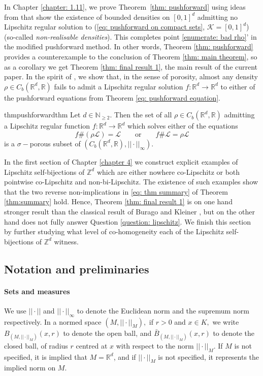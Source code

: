 \documentclass{article}
\newcommand{\R}{\mathbb{R}}
\newcommand{\Z}{\mathbb{Z}}
\newcommand{\N}{\mathbb{N}}
\newcommand{\leb}{\mc{L}}
\newcommand{\mc}[1]{\mathcal{#1}}
\begin{document}
In Chapter \ref{chapter: 1.11}, we prove Theorem~\ref{thm: pushforward} using ideas from \cite{dymond2018mapping} that show the existence of bounded densities on $[0,1]^d$ admitting no Lipschitz regular solution to (\ref{eq: pushforward on compact sets}, $\mathcal{K} = [0,1]^d$) (so-called \emph{non-realisable densities}). This completes point \ref{enumerate: bad rho}' in the modified pushforward method. In other words, Theorem \ref{thm: pushforward} provides a counterexample to the conclusion of Theorem \ref{thm: main theorem}, so as a corollary we get Theorem \ref{thm: final result 1}, the main result of the current paper. In the spirit of \cite[Theorem~$4.1$]{dymond2018mapping}, we show that, in the sense of porosity, almost any density $\rho \in C_b(\R^d,\R)$ fails to admit a Lipschitz regular solution $f:\R^d \to \R^d$ to either of the pushforward equations from Theorem \ref{eq: pushforward equation}.
\begin{restatable}{thm}{pushforwardthm} \label{thm: pushforward}
    Let $d \in \N_{\geq 2}.$ Then the set of all $\rho\in C_b(\R^d,\R)$ admitting a Lipschitz regular function $f: \R^d \to \R^d$ which solves either of the equations $$f\#(\rho\leb) = \leb \qquad \text{or} \qquad f\#\leb = \rho\leb$$ is a $\sigma-$porous subset of $(C_b(\R^d,\R), ||\cdot||_{\infty}).$
\end{restatable}
In the first section of Chapter \ref{chapter 4} we construct explicit examples of Lipschitz self-bijections of $\Z^d$ which are either nowhere co-Lipschitz or both pointwise co-Lipschitz and non-bi-Lipschitz. The existence of such examples show that the two reverse non-implications in \eqref{eq: thm summary} of Theorem \ref{thm:summary} hold.
Hence, Theorem \ref{thm: final result 1} is on one hand stronger result than the classical result of Burago and Kleiner \cite[Theorem~$1.1$]{burago1998separated}, but on the other hand does not fully answer Question \ref{question: lipschitz}. 
We finish this section by further studying what level of co-homogeneity each of the Lipschitz self-bijections of $\Z^d$ witness.

\subsection{Notation and preliminaries}
\paragraph{Sets and measures}
We use $||\cdot||$ and $||\cdot||_\infty$ to denote the Euclidean norm and the supremum norm respectively. In a normed space $(M,||\cdot||_M),$ if $r>0$ and $x \in K,$ we write $B_{(M,||\cdot||_M)}(x,r)$ to denote the open ball, and $\bar{B}_{(M,||\cdot||_M)}(x,r)$ to denote the closed ball, of radius $r$ centred at $x$ with respect to the norm $||\cdot||_M$. If $M$ is not specified, it is implied that $M=\R^d$, and if $||\cdot||_M$ is not specified, it represents the implied norm on $M$.
\end{document}
